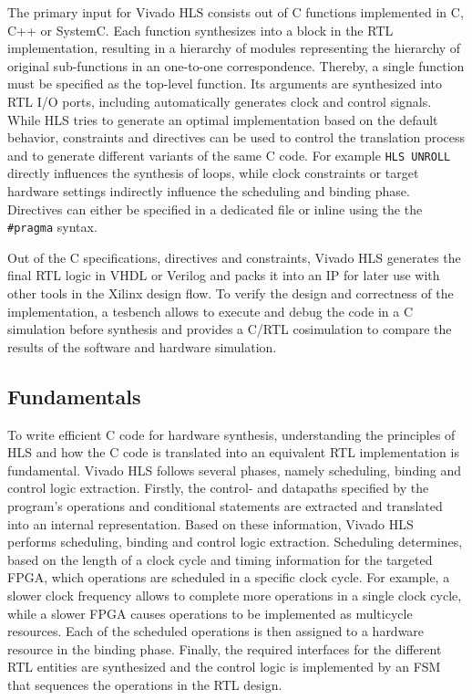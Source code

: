 The primary input for Vivado \ac{HLS} consists out of C functions implemented
in C, C++ or SystemC. Each function synthesizes into a block in the \ac{RTL}
implementation, resulting in a hierarchy of modules representing the hierarchy
of original sub-functions in an one-to-one correspondence. Thereby, a single
function must be specified as the top-level function. Its arguments are
synthesized into \ac{RTL} I/O ports, including automatically generates clock
and control signals. While \ac{HLS} tries to generate an optimal
implementation based on the default behavior, constraints and directives can
be used to control the translation process and to generate different variants
of the same C code. For example \lstinline{HLS UNROLL} directly influences the
synthesis of loops, while clock constraints or target hardware settings
indirectly influence the scheduling and binding phase. Directives can either
be specified in a dedicated file or inline using the the \lstinline{#pragma}
syntax.

Out of the C specifications, directives and constraints, Vivado \ac{HLS}
generates the final \ac{RTL} logic in \ac{VHDL} or Verilog and packs it into
an \ac{IP} for later use with other tools in the Xilinx design flow. To verify
the design and correctness of the implementation, a tesbench allows to execute
and debug the code in a C simulation before synthesis and provides a C/RTL
cosimulation to compare the results of the software and hardware simulation.

\subsection{Fundamentals}
To write efficient C code for hardware synthesis, understanding the principles
of \ac{HLS} and how the C code is translated into an equivalent \ac{RTL}
implementation is fundamental. Vivado \ac{HLS} follows several phases, namely
scheduling, binding and control logic extraction. Firstly, the control- and
datapaths specified by the program's operations and conditional statements are
extracted and translated into an internal representation. Based on these
information, Vivado HLS performs scheduling, binding and control logic
extraction. Scheduling determines, based on the length of a clock cycle and
timing information for the targeted \ac{FPGA}, which operations are scheduled
in a specific clock cycle. For example, a slower clock frequency allows to
complete more operations in a single clock cycle, while a slower \ac{FPGA}
causes operations to be implemented as multicycle resources. Each of the
scheduled operations is then assigned to a hardware resource in the binding
phase. Finally, the required interfaces for the different \ac{RTL} entities
are synthesized and the control logic is implemented by an \ac{FSM} that
sequences the operations in the \ac{RTL} design.

